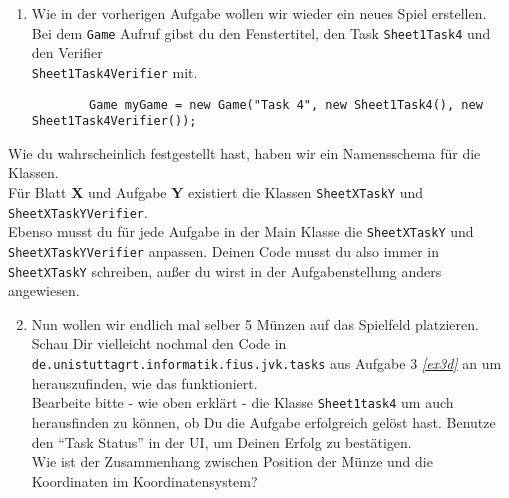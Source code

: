 
\newcommand{\javadocRoot}{https://fius.github.io/ICGE2/master/}
\label{ex4}

\begin{enumerate}
    \item Wie in der vorherigen Aufgabe wollen wir wieder ein neues Spiel erstellen.\\
    Bei dem \lstinline{Game} Aufruf gibst du den Fenstertitel, den Task \lstinline{Sheet1Task4} und den Verifier\\\lstinline{Sheet1Task4Verifier} mit.

    \begin{lstlisting}
		Game myGame = new Game("Task 4", new Sheet1Task4(), new Sheet1Task4Verifier());
    \end{lstlisting}
\end{enumerate}

\begin{Infobox}
    Wie du wahrscheinlich festgestellt hast, haben wir ein Namensschema für die Klassen.\\
    Für Blatt \textbf{X} und Aufgabe \textbf{Y} existiert die Klassen \lstinline{SheetXTaskY} und \lstinline{SheetXTaskYVerifier}.\\
    Ebenso musst du für jede Aufgabe in der Main Klasse die \lstinline{SheetXTaskY} und \lstinline{SheetXTaskYVerifier} anpassen.
    Deinen Code musst du also immer in \lstinline{SheetXTaskY} schreiben, außer du wirst in der Aufgabenstellung anders angewiesen.
\end{Infobox}

\begin{enumerate}
	\setcounter{enumi}{1}
    \item Nun wollen wir endlich mal selber 5 Münzen auf das Spielfeld platzieren.
	Schau Dir vielleicht nochmal den Code in \texttt{de.unistuttagrt.informatik.fius.jvk.tasks} aus Aufgabe 3 \textit{\ref{ex3d}} an um herauszufinden, wie das funktioniert.\\
	Bearbeite bitte - wie oben erklärt - die Klasse \lstinline{Sheet1task4} um auch herausfinden zu können, ob Du die Aufgabe erfolgreich gelöst hast. Benutze den \enquote{Task Status} in der UI, um Deinen Erfolg zu bestätigen.\\
	Wie ist der Zusammenhang zwischen Position der Münze und die Koordinaten im Koordinatensystem?
\end{enumerate}

